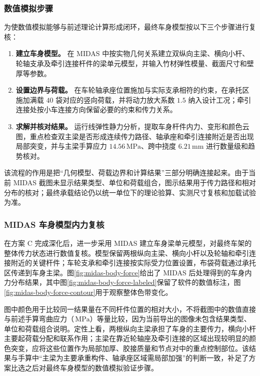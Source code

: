 \documentclass[UTF8,a4paper,12pt,fontset=none]{ctexart}
\numberwithin{equation}{section}
\numberwithin{figure}{section}
\numberwithin{table}{section}
\newcommand{\mm}{\,\mathrm{mm}}
\newcommand{\MPa}{\,\mathrm{MPa}}
\begin{document}
\subsubsection{数值模拟步骤}
为使数值模拟能够与前述理论计算形成闭环，最终车身模型按以下三个步骤进行复核：
\begin{enumerate}[label=\arabic*.,leftmargin=2.8em]
  \item \textbf{建立车身模型。} 在 MIDAS 中按实物几何关系建立双纵向主梁、横向小杆、轮轴支承及牵引连接杆件的梁单元模型，并输入竹材弹性模量、截面尺寸和壁厚等参数。
  \item \textbf{设置边界与荷载。} 在车轮轴承座位置施加与实际支承相符的约束，在承托区施加满载 $40$ 袋对应的竖向荷载，并将动力放大系数 $1.5$ 纳入设计工况；牵引连接处按小车连接方向保留必要的约束和传力关系。
  \item \textbf{求解并核对结果。} 运行线弹性静力分析，提取车身杆件内力、变形和颜色云图，重点检查双主梁是否形成连续传力路径、轴承座和牵引连接附近是否出现局部突变，并与主梁手算应力 $14.56\MPa$、跨中挠度 $6.21\mm$ 进行数量级和趋势核对。
\end{enumerate}
该流程的作用是把“几何模型、荷载边界和计算结果”三部分明确连接起来。由于当前 MIDAS 截图未显示结果类型、单位和荷载组合，图示结果用于传力路径和相对分布的核对；最终承载结论仍以统一单位下的理论验算、实测尺寸复核和加载试验为准。

\subsubsection{MIDAS 车身模型内力复核}
在方案 C 完成深化后，进一步采用 MIDAS 建立车身梁单元模型，对最终车架的整体传力状态进行数值复核。模型保留两根纵向主梁、横向小杆以及轮轴和牵引连接附近的关键杆件；车轮支承和牵引连接按实际受力位置设置，布袋荷载通过承托区传递到车身主梁。图\ref{fig:midas-body-force}给出了 MIDAS 后处理得到的车身内力分布结果，其中图\ref{fig:midas-body-force-labeled}保留了软件的数值标注，图\ref{fig:midas-body-force-contour}用于观察整体色带变化。

图中颜色用于比较同一结果量在不同杆件位置的相对大小，不将截图中的数值直接与前述手算弯曲应力（$\MPa$）等量比较，因为当前导出的图像未包含结果类型、单位和荷载组合说明。定性上看，两根纵向主梁承担了车身的主要传力，横向小杆主要起荷载分配和联系作用；主梁在靠近轮轴座及牵引连接的区域出现较明显的颜色突变，应将这些位置作为局部加厚、胶接质量和节点对中的重点控制部位。该结果与手算中“主梁为主要承重构件、轴承座区域需局部加强”的判断一致，补足了方案比选之后对最终车身模型的数值模拟验证步骤。
\end{document}
